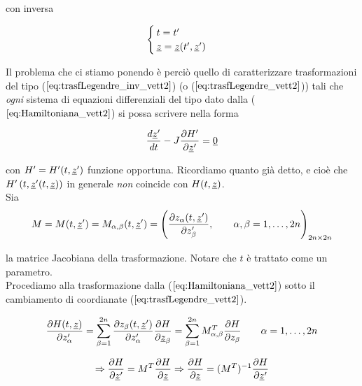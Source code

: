 con inversa

\begin{equation} \label{eq:trasfLegendre_vett2}
  \begin{cases}
    t = t' \\ \uline{z} = \uline{z}(t', \uline{z}')
  \end{cases}
\end{equation}

Il problema che ci stiamo ponendo è perciò quello di caratterizzare trasformazioni del tipo ($ \ref{eq:trasfLegendre_inv_vett2} $) (o ($ \ref{eq:trasfLegendre_vett2} $)) tali che \textit{ogni} sistema di equazioni differenziali del tipo dato dalla ($ \ref{eq:Hamiltoniana_vett2} $) si possa scrivere nella forma

\begin{equation} \label{eq:Hamiltoniana'_vett2}
  \frac{d \uline{z}'}{d t} - J \frac{\partial H'}{\partial \uline{z}'} = \uline{0}
\end{equation}

con $ H' = H' (t, \uline{z}') $ funzione opportuna. Ricordiamo quanto già detto, e cioè che $ H'\left(t, \uline{z}'(t, \uline{z})\right) $ in generale \textit{non} coincide con $ H (t, \uline{z}) $. \\


Sia
\begin{equation*}
  M = M(t, \uline{z}') = M_{\alpha, \beta}(t, \uline{z}') = \left( \frac{\partial z_{\alpha}(t, \uline{z}')}{\partial z'_{\beta}}, \qquad \alpha, \beta = 1, \dots, 2n \right)_{2n \times 2n}
\end{equation*}

la matrice Jacobiana della trasformazione. Notare che $ t $ è trattato come un parametro.\\
Procediamo alla trasformazione dalla ($ \ref{eq:Hamiltoniana_vett2} $) sotto il cambiamento di coordianate ($ \ref{eq:trasfLegendre_vett2} $).

\begin{equation*}
  \frac{\partial H(t, \uline{z})}{\partial z'_{\alpha}} = \sum_{\beta = 1}^{2n} \frac{\partial z_{\beta}(t, \uline{z}')}{\partial z'_{\alpha}} \frac{\partial H}{\partial \uline{z}_{\beta}} = \sum_{\beta = 1}^{2n} M_{\alpha, \beta}^T \frac{\partial H}{\partial z_{\beta}} \qquad \alpha = 1, \dots, 2n
\end{equation*}

\begin{equation} \label{eq:dH/dz'2}
  \Rightarrow \frac{\partial H}{\partial \uline{z}'} = M^T \frac{\partial H}{\partial \uline{z}} \Rightarrow \frac{\partial H}{\partial \uline{z}} = (M^T)^{-1} \frac{\partial H}{\partial \uline{z}'}
\end{equation}

